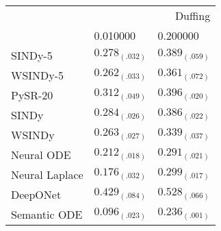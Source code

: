 \begin{tabular}{lll}
\toprule
 & \multicolumn{2}{r}{Duffing} \\
 & 0.010000 & 0.200000 \\
\midrule
SINDy-5 & $0.278_{(.032)}$ & $0.389_{(.059)}$ \\
WSINDy-5 & $0.262_{(.033)}$ & $0.361_{(.072)}$ \\
PySR-20 & $0.312_{(.049)}$ & $0.396_{(.020)}$ \\
SINDy & $0.284_{(.026)}$ & $0.386_{(.022)}$ \\
WSINDy & $0.263_{(.027)}$ & $0.339_{(.037)}$ \\
Neural ODE & $0.212_{(.018)}$ & $0.291_{(.021)}$ \\
Neural Laplace & $0.176_{(.032)}$ & $0.299_{(.017)}$ \\
DeepONet & $0.429_{(.084)}$ & $0.528_{(.066)}$ \\
Semantic ODE & $0.096_{(.023)}$ & $0.236_{(.001)}$ \\
\bottomrule
\end{tabular}
